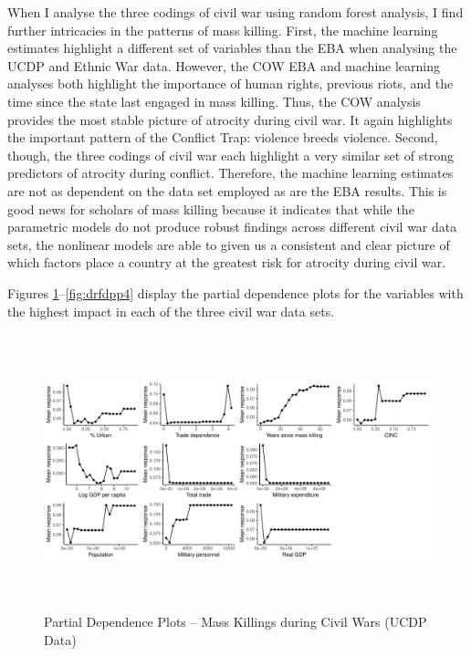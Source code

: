 When I analyse the three codings of civil war using random forest analysis, I find further intricacies in the patterns of mass killing. First, the machine learning estimates highlight a different set of variables than the EBA when analysing the UCDP and Ethnic War data. However, the COW EBA and machine learning analyses both highlight the importance of human rights, previous riots, and the time since the state last engaged in mass killing. Thus, the COW analysis provides the most stable picture of atrocity during civil war. It again highlights the important pattern of the Conflict Trap: violence breeds violence. Second, though, the three codings of civil war each highlight a very similar set of strong predictors of atrocity during conflict. Therefore, the machine learning estimates are not as dependent on the data set employed as are the EBA results. This is good news for scholars of mass killing because it indicates that while the parametric models do not produce robust findings across different civil war data sets, the nonlinear models are able to given us a consistent and clear picture of which factors place a country at the greatest risk for atrocity during civil war. 

Figures \ref{fig:drfdpp2}--\ref{fig:drfdpp4} display the partial dependence plots for the variables with the highest impact in each of the three civil war data sets.

\vspace{1cm}
	
\begin{figure}[H]
    \centering
    \includegraphics[width=\textwidth, height=8cm]{images/rf-ucdp-pd.pdf}
    \caption{Partial Dependence Plots -- Mass Killings during Civil Wars (UCDP Data)}
    \label{fig:drfdpp2}
\end{figure}
	
